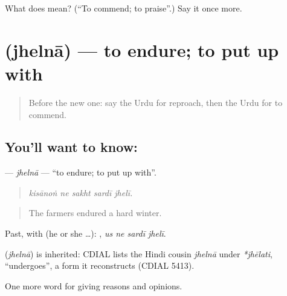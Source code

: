\begin{tcolorbox}[breakable,colback=teal!4,colframe=teal!35!black,title={Before you move on}]
What does  mean? (\textquotedblleft{}To commend; to praise\textquotedblright{}.) Say it once more.
\end{tcolorbox}
\section[\texorpdfstring{\ur{جھیلنا} (jhelnā)}{جھیلنا (jhelnā)}]{ (jhelnā) — to endure; to put up with}

\label{lesson:UR-C355-jhelna}



\begin{quote}
Before the new one: say the Urdu for reproach, then the Urdu for to commend.
\end{quote}

\subsection*{You'll want to know: }
\textbf{} — \emph{jhelnā} — \textquotedblleft{}to endure; to put up with\textquotedblright{}.

\begin{quote}
    
\end{quote}

\begin{quote}
\emph{kisānoṅ ne sakht sardī jhelī.}
\end{quote}

\begin{quote}
The farmers endured a hard winter.
\end{quote}

Past, with  (he or she …):    , \emph{us ne sardī jhelī}.

\begin{cousinweb}
\textbf{} (\emph{jhelnā}) is inherited: CDIAL lists the Hindi cousin \emph{jhelnā} under \emph{*jhēlati}, \textquotedblleft{}undergoes\textquotedblright{}, a form it reconstructs (CDIAL 5413).
\end{cousinweb}

\begin{grammarlens}[title={What you've built}]
One more word for giving reasons and opinions.
\end{grammarlens}

